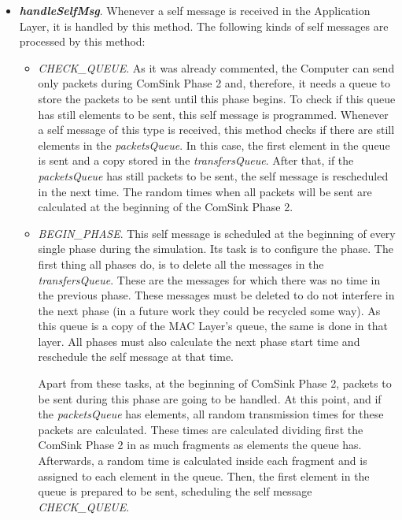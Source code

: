 \begin{itemize}
  \item \textbf{\textit{handleSelfMsg}}. Whenever a self message is received in the Application Layer, it is handled by this method. The following 
  kinds of self messages are processed by this method:
  \begin{itemize}
    \item \textit{CHECK\_QUEUE}. As it was already commented, the Computer can send only packets during ComSink Phase 2 and, therefore, it needs a 
    queue to store the packets to be sent until this phase begins. To check if this queue has still elements to be sent, this self message is programmed.
    Whenever a self message of this type is received, this method checks if there are still elements in the \textit{packetsQueue}. In this case,
    the first element in the queue is sent and a copy stored in the \textit{transfersQueue}. After that, if the \textit{packetsQueue} has still
    packets to be sent, the self message is rescheduled in the next time. The random times when all packets will be sent are calculated at the
    beginning of the ComSink Phase 2.

    \item \textit{BEGIN\_PHASE}. This self message is scheduled at the beginning of every single phase during the simulation. Its task is to 
    configure the phase. The first thing all phases do, is to delete all the messages in the \textit{transfersQueue}. These are the messages for which 
    there was no time in the previous phase. These messages must be deleted to do not interfere in the next phase (in a future work they could be 
    recycled some way). As this queue is a copy of the \ac{MAC} Layer's queue, the same is done in that layer. All phases must also calculate the 
    next phase start time and reschedule the self message at that time.

    Apart from these tasks, at the beginning of ComSink Phase 2, packets to be sent during this phase are going to be handled. At this point, and 
    if the \textit{packetsQueue} has elements, all random transmission times for these packets are calculated. These times are calculated dividing 
    first the ComSink Phase 2 in as much fragments as elements the queue has. Afterwards, a random time is calculated inside each fragment and
    is assigned to each element in the queue. Then, the first element in the queue is prepared to be sent, scheduling the self message 
    \textit{CHECK\_QUEUE}.
  \end{itemize}
\end{itemize}


